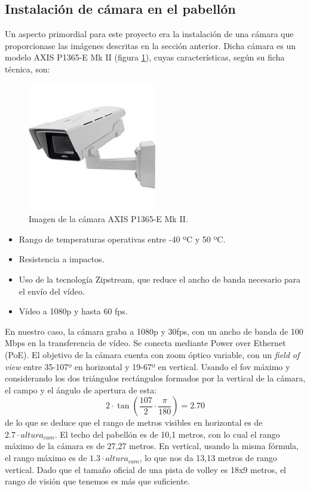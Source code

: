 \subsection{Instalación de cámara en el pabellón}
Un aspecto primordial para este proyecto era la instalación de una cámara que proporcionase las imágenes descritas en la sección anterior. Dicha cámara es un modelo AXIS P1365-E Mk II (figura \ref{fig:camara}), cuyas características, según su ficha técnica, son:

\begin{figure}
    \centering
    \includegraphics[width=0.5\textwidth]{images/camara}
    \caption{Imagen de la cámara AXIS P1365-E Mk II.}
    \label{fig:camara}
\end{figure}

\begin{itemize}
    \item Rango de temperaturas operativas entre -40 ºC y 50 ºC.
    \item Resistencia a impactos.
    \item Uso de la tecnología Zipstream, que reduce el ancho de banda necesario para el envío del vídeo.
    \item Vídeo a 1080p y hasta 60 fps.
\end{itemize}

En nuestro caso, la cámara graba a 1080p y 30fps, con un ancho de banda de 100 Mbps en la transferencia de vídeo. Se conecta mediante Power over Ethernet (PoE). El objetivo de la cámara cuenta con zoom óptico variable, con un \textit{field of view} entre 35-107º en horizontal y 19-67º en vertical. Usando el fov máximo y considerando los dos triángulos rectángulos formados por la vertical de la cámara, el campo y el ángulo de apertura de esta:
\[
    2 \cdot \tan(\frac{107}{2} \cdot \frac{\pi}{180}) = 2.70
\]
de lo que se deduce que el rango de metros visibles en horizontal es de $2.7\cdot altura_{cam}$. El techo del pabellón es de 10,1 metros, con lo cual el rango máximo de la cámara es de 27,27 metros. En vertical, usando la misma fórmula, el rango máximo es de $1.3 \cdot altura_{cam}$, lo que nos da 13,13 metros de rango vertical. Dado que el tamaño oficial de una pista de volley es 18x9 metros, el rango de visión que tenemos es más que suficiente.

